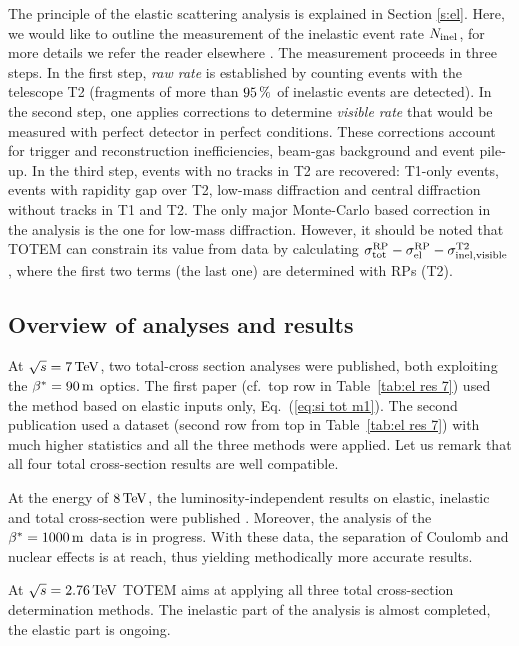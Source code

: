 \documentclass{desyproc}
\def\un#1{\,{\rm #1}}
\begin{document}
The principle of the elastic scattering analysis is explained in Section \ref{s:el}. Here, we would like to outline the measurement of the inelastic event rate $N_{\rm inel}$, for more details we refer the reader elsewhere \cite{si_tot_8,si_inel_7}. The measurement proceeds in three steps. In the first step, {\em raw rate} is established by counting events with the telescope T2 (fragments of more than $95\un{\%}$ of inelastic events are detected). In the second step, one applies corrections to determine {\em visible rate} that would be measured with perfect detector in perfect conditions. These corrections account for trigger and reconstruction inefficiencies, beam-gas background and event pile-up. In the third step, events with no tracks in T2 are recovered:  T1-only events, events with rapidity gap over T2, low-mass diffraction and central diffraction without tracks in T1 and T2. The only major Monte-Carlo based correction in the analysis is the one for low-mass diffraction. However, it should be noted that TOTEM can constrain its value from data by calculating $\sigma_{\rm tot}^{\rm RP} - \sigma_{\rm el}^{\rm RP} - \sigma_{\rm inel, visible}^{\rm T2}$, where the first two terms (the last one) are determined with RPs (T2).


\subsection{Overview of analyses and results}

At $\sqrt s =7\un{TeV}$, two total-cross section analyses were published, both exploiting the $\beta^*=90\un{m}$ optics. The first paper \cite{si_el_7_90a} (cf.~top row in Table~\ref{tab:el res 7}) used the method based on elastic inputs only, Eq.~(\ref{eq:si tot m1}). The second publication \cite{si_tot_7} used a dataset (second row from top in Table~\ref{tab:el res 7}) with much higher statistics and all the three methods were applied. Let us remark that all four total cross-section results are well compatible.

At the energy of $8\un{TeV}$, the luminosity-independent results on elastic, inelastic and total cross-section were published \cite{si_tot_8}. Moreover, the analysis of the $\beta^*=1000\un{m}$ data is in progress. With these data, the separation of Coulomb and nuclear effects is at reach, thus yielding methodically more accurate results.

At $\sqrt s = 2.76\un{TeV}$ TOTEM aims at applying all three total cross-section determination methods. The inelastic part of the analysis is almost completed, the elastic part is ongoing.
\end{document}
